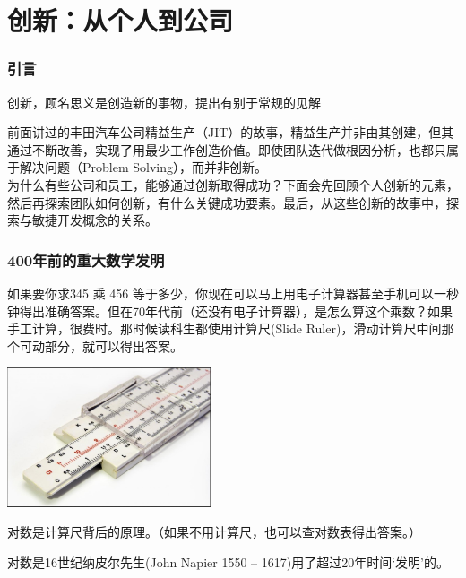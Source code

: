 \chapter{创新：从个人到公司} %

\hypertarget{ux5f15ux8a00}{%
\subsection{引言}\label{ux5f15ux8a00}}

创新，顾名思义是创造新的事物，提出有别于常规的见解

前面讲过的丰田汽车公司精益生产（JIT）的故事，精益生产并非由其创建，但其通过不断改善，实现了用最少工作创造价值。即使团队迭代做根因分析，也都只属于解决问题（Problem Solving），而并非创新。\\

为什么有些公司和员工，能够通过创新取得成功？下面会先回顾个人创新的元素，然后再探索团队如何创新，有什么关键成功要素。最后，从这些创新的故事中，探索与敏捷开发概念的关系。

\hypertarget{ux5e74ux524dux7684ux91cdux5927ux6570ux5b66ux53d1ux660e}{%
\subsection{400年前的重大数学发明}\label{ux5e74ux524dux7684ux91cdux5927ux6570ux5b66ux53d1ux660e}}

如果要你求345 乘 456
等于多少，你现在可以马上用电子计算器甚至手机可以一秒钟得出准确答案。但在70年代前（还没有电子计算器），是怎么算这个乘数？如果手工计算，很费时。那时候读科生都使用计算尺(Slide
Ruler)，滑动计算尺中间那个可动部分，就可以得出答案。


\includegraphics[width=6cm]{SlideRulerScreenshot_2023-07-28_182839.jpg}

对数是计算尺背后的原理。（如果不用计算尺，也可以查对数表得出答案。）

对数是16世纪纳皮尔先生(John Napier 1550 --
1617)用了超过20年时间`发明'的。


